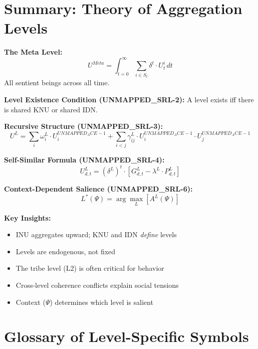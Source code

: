 \section{Summary: Theory of Aggregation Levels}
\label{sec:aaa-summary}

\begin{tcolorbox}[colback=gray!5!white, colframe=gray!75!black, title=Appendix UNMAPPED_WHO Summary]

\textbf{The Meta Level:}
$$U^{Meta} = \int_{t=0}^{\infty} \sum_{i \in S_t} \delta^t \cdot U^i_t \, dt$$
All sentient beings across all time.

\textbf{Level Existence Condition (UNMAPPED_SRL-2):}
A level exists iff there is shared KNU or shared IDN.

\textbf{Recursive Structure (UNMAPPED_SRL-3):}
$$U^L = \sum_i \omega^L_i \cdot U^{UNMAPPED_ACE-1}_i + \sum_{i<j} \gamma^L_{ij} \cdot U^{UNMAPPED_ACE-1}_i \cdot U^{UNMAPPED_ACE-1}_j$$

\textbf{Self-Similar Formula (UNMAPPED_SRL-4):}
$$U^L_{d,t} = (\delta^L)^t \cdot [G^L_{d,t} - \lambda^L \cdot P^L_{d,t}]$$

\textbf{Context-Dependent Salience (UNMAPPED_SRL-6):}
$$L^*(\Psi) = \arg\max_L [A^L(\Psi)]$$

\textbf{Key Insights:}
\begin{itemize}
\item INU aggregates upward; KNU and IDN \emph{define} levels
\item Levels are endogenous, not fixed
\item The tribe level (L2) is often critical for behavior
\item Cross-level coherence conflicts explain social tensions
\item Context ($\Psi$) determines which level is salient
\end{itemize}

\end{tcolorbox}

\section{Glossary of Level-Specific Symbols}
\label{sec:aaa-glossary}

